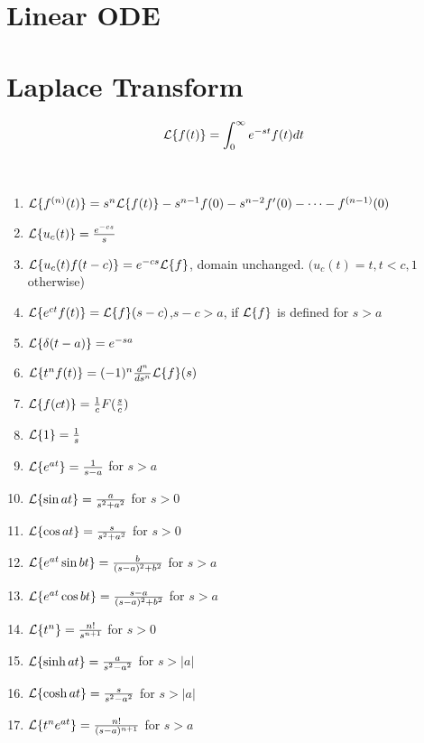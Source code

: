 \documentclass[12pt]{article}
\begin{document}
\section{Linear ODE}

\begin{theorem}

\end{theorem}


\section{Laplace Transform}

\begin{definition}
	\begin{equation}
		\mathcal{L}\{f(t)\} = \int_{0}^{\infty} e^{-st} f(t) dt
	\end{equation}
\end{definition}

\begin{theorem}
	\ 
\begin{enumerate}
	\item $\mathcal{L}\{f^{(n)}(t)\} = s^n \mathcal{L}\{f(t)\} - s^{n-1}f(0) - s^{n-2}f'(0) - \cdots - f^{(n-1)}(0)$
	\item $\mathcal{L}\{u_{c}(t)\} = \frac{e^{-cs}}{s}$
	\item $\mathcal{L}\{u_c(t)f(t-c)\} = e^{-cs} \mathcal{L}\{f\}$, domain unchanged. $(u_c(t) = t, t<c, 1$ otherwise)
	\item $\mathcal{L}\{e^{ct}f(t)\} = \mathcal{L}\{f\}(s-c)$,$s-c > a$, if $\mathcal{L}\{f\}$ is defined for $s>a$
	\item $\mathcal{L}\{\delta(t-a)\} = e^{-sa}$
	\item $\mathcal{L}\{t^nf(t)\} = (-1)^n \frac{d^n}{ds^n} \mathcal{L}\{f\}(s)$
	\item $\mathcal{L}\{f(ct)\} = \frac{1}{c}F(\frac{s}{c})$
	\item $\mathcal{L}\{1\} = \frac{1}{s}$
	\item $\mathcal{L}\{e^{at}\} = \frac{1}{s-a}$ for $s>a$
	\item $\mathcal{L}\{\sin{at}\} = \frac{a}{s^2+a^2}$ for $s>0$
	\item $\mathcal{L}\{\cos{at}\} = \frac{s}{s^2+a^2}$ for $s>0$
	\item $\mathcal{L}\{e^{at}\sin{bt}\} = \frac{b}{(s-a)^2+b^2}$ for $s>a$
	\item $\mathcal{L}\{e^{at}\cos{bt}\} = \frac{s-a}{(s-a)^2+b^2}$ for $s>a$
	\item $\mathcal{L}\{t^n\} = \frac{n!}{s^{n+1}}$ for $s>0$
	\item $\mathcal{L}\{\sinh{at}\} = \frac{a}{s^2-a^2}$ for $s>|a|$
	\item $\mathcal{L}\{\cosh{at}\} = \frac{s}{s^2-a^2}$ for $s>|a|$
	\item $\mathcal{L}\{t^n e^{at}\} = \frac{n!}{(s-a)^{n+1}}$ for $s>a$
\end{enumerate}	
\end{theorem}
\end{document}
